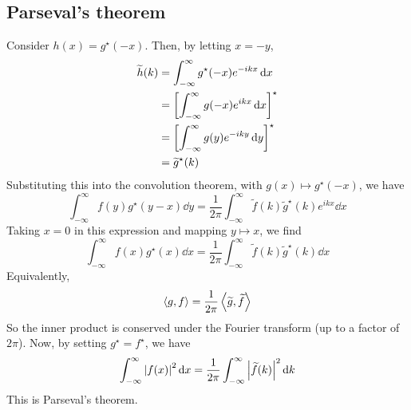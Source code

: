 \subsection{Parseval's theorem}
Consider \( h(x) = g^\star(-x) \).
Then, by letting \( x = -y \),
\begin{align*}
	\widetilde h(k) & = \int_{-\infty}^\infty g^\star(-x) e^{-ikx} \dd{x}      \\
	                & = \qty[\int_{-\infty}^\infty g(-x) e^{ikx} \dd{x}]^\star \\
	                & = \qty[\int_{-\infty}^\infty g(y) e^{-iky} \dd{y}]^\star \\
	                & = \widetilde g^\star(k)
\end{align*}
Substituting this into the convolution theorem, with \( g(x) \mapsto g^\star(-x) \), we have
\[
	\int_{-\infty}^\infty f(y) g^\star(y-x) \dd{y} = \frac{1}{2\pi} \int_{-\infty}^\infty \widetilde f(k) \widetilde g^\star(k) e^{ikx} \dd{x}
\]
Taking \( x = 0 \) in this expression and mapping \( y \mapsto x \), we find
\[
	\int_{-\infty}^\infty f(x) g^\star(x) \dd{x} = \frac{1}{2\pi} \int_{-\infty}^\infty \widetilde f(k) \widetilde g^\star(k) \dd{x}
\]
Equivalently,
\[
	\left\langle{g,f}\right\rangle = \frac{1}{2\pi} \left\langle{\widetilde g, \widetilde f}\right\rangle
\]
So the inner product is conserved under the Fourier transform (up to a factor of \( 2 \pi \)).
Now, by setting \( g^\star = f^\star \), we have
\[
	\int_{-\infty}^\infty \abs{f(x)}^2 \dd{x} = \frac{1}{2\pi} \int_{-\infty}^\infty \abs{\widetilde f(k)}^2 \dd{k}
\]
This is Parseval's theorem.

